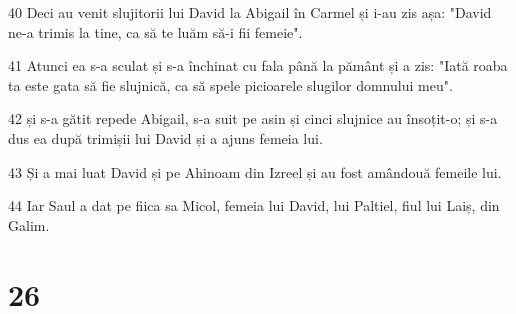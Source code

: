 \par 40 Deci au venit slujitorii lui David la Abigail în Carmel și i-au zis așa: "David ne-a trimis la tine, ca să te luăm să-i fii femeie".
\par 41 Atunci ea s-a sculat și s-a închinat cu fala până la pământ și a zis: "Iată roaba ta este gata să fie slujnică, ca să spele picioarele slugilor domnului meu".
\par 42 și s-a gătit repede Abigail, s-a suit pe asin și cinci slujnice au însoțit-o; și s-a dus ea după trimișii lui David și a ajuns femeia lui.
\par 43 Și a mai luat David și pe Ahinoam din Izreel și au fost amândouă femeile lui.
\par 44 Iar Saul a dat pe fiica sa Micol, femeia lui David, lui Paltiel, fiul lui Laiș, din Galim.

\chapter{26}

